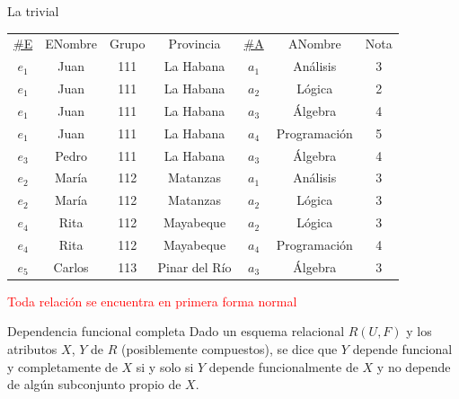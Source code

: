\begin{frame}{La trivial}
    \centering
    \begin{tabular}{ccccccc}
        \underline{\#E} & ENombre & Grupo & Provincia & \underline{\#A} & ANombre & Nota\\
        $e_1$ & Juan & 111 & La Habana & $a_1$ & An\'alisis & 3\\
        $e_1$ & Juan & 111 & La Habana & $a_2$ & L\'ogica & 2\\
        $e_1$ & Juan & 111 & La Habana  & $a_3$ & \'Algebra & 4\\
        $e_1$ & Juan & 111 & La Habana & $a_4$ & Programaci\'on & 5\\
        $e_3$ & Pedro & 111 & La Habana & $a_3$ & \'Algebra & 4\\
        $e_2$ & Mar\'ia & 112 &  Matanzas & $a_1$ & An\'alisis & 3\\
        $e_2$ & Mar\'ia &  112 & Matanzas & $a_2$ & L\'ogica & 3\\
        $e_4$ & Rita & 112 & Mayabeque & $a_2$ & L\'ogica & 3\\
        $e_4$ & Rita &  112 & Mayabeque & $a_4$ & Programaci\'on & 4\\
        $e_5$ & Carlos &  113 & Pinar del R\'io & $a_3$ & \'Algebra & 3
    \end{tabular}
    \vspace{5mm}

    \centering
    \Large \textcolor{red}{Toda relaci\'on se encuentra en primera forma normal}
\end{frame}

\begin{frame}{Dependencia funcional completa}
    Dado un esquema relacional $R(U,F)$ y los atributos $X$, $Y$ de $R$
    (posiblemente compuestos), se dice que $Y$ depende funcional
    y completamente de $X$ si y solo si $Y$ depende funcionalmente de
    $X$ y no depende de alg\'un subconjunto propio de $X$.
\end{frame}

